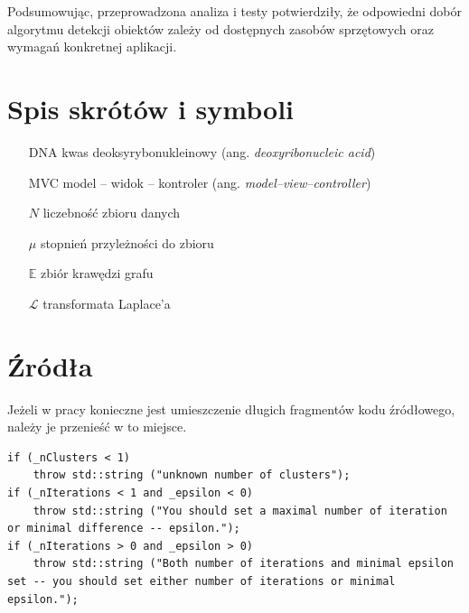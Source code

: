 \documentclass[a4paper,twoside,12pt]{book}
\newcommand{\obcy}[1]{\emph{#1}}
\newcommand{\english}[1]{{\selectlanguage{british}\obcy{#1}}}
\begin{document}
Podsumowując, przeprowadzona analiza i testy potwierdziły, że odpowiedni dobór algorytmu detekcji obiektów zależy od dostępnych zasobów sprzętowych oraz wymagań konkretnej aplikacji.







\backmatter

\printbibliography           %

\begin{appendices}

\chapter{Spis skrótów i symboli}

\begin{itemize}
\item[DNA] kwas deoksyrybonukleinowy (ang. \english{deoxyribonucleic acid})
\item[MVC] model -- widok -- kontroler (ang. \english{model--view--controller}) 
\item[$N$] liczebność zbioru danych
\item[$\mu$] stopnień przyleżności do zbioru
\item[$\mathbb{E}$] zbiór krawędzi grafu
\item[$\mathcal{L}$] transformata Laplace'a 
\end{itemize}


\chapter{Źródła}

Jeżeli w pracy konieczne jest umieszczenie długich fragmentów kodu źródłowego, należy je przenieść w to miejsce.

\begin{lstlisting}
if (_nClusters < 1)
	throw std::string ("unknown number of clusters");
if (_nIterations < 1 and _epsilon < 0)
	throw std::string ("You should set a maximal number of iteration or minimal difference -- epsilon.");
if (_nIterations > 0 and _epsilon > 0)
	throw std::string ("Both number of iterations and minimal epsilon set -- you should set either number of iterations or minimal epsilon.");
\end{lstlisting}




\end{appendices}
\end{document}
